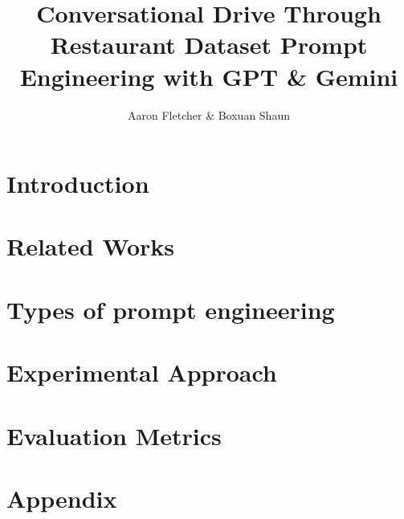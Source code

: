 \documentclass{article}
\title{Conversational Drive Through Restaurant Dataset\: Prompt Engineering with GPT \& Gemini}
\author{Aaron Fletcher \& Boxuan Shaun}
\begin{document}
\maketitle


\section{Introduction}



\section{Related Works}
\section{Types of prompt engineering}

\newpage
\section{Experimental Approach}

\section{Evaluation Metrics}
\newpage
\section{Appendix}

\end{document}

